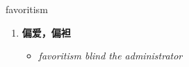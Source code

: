 
\begin{frame}
{\huge favoritism}
\begin{center}
\begin{enumerate}\Large
  \item \textbf{偏爱，偏袒}
  \begin{itemize}
    \item \em{\Large{favoritism blind the administrator}}
  \end{itemize}
\end{enumerate}
\end{center}
\end{frame}
